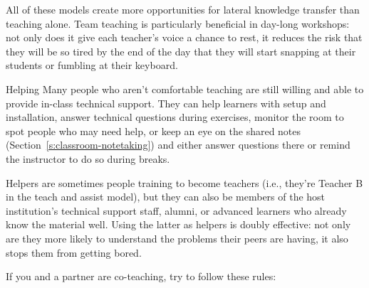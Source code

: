 All of these models create more opportunities for lateral knowledge
transfer than teaching alone. Team teaching is particularly beneficial
in day-long workshops: not only does it give each teacher's voice a
chance to rest, it reduces the risk that they will be so tired by the
end of the day that they will start snapping at their students or
fumbling at their keyboard.

\begin{aside}{Helping}
  Many people who aren't comfortable teaching are still willing and able
  to provide in-class technical support. They can help learners with
  setup and installation, answer technical questions during exercises,
  monitor the room to spot people who may need help, or keep an eye on
  the shared notes (Section~\ref{s:classroom-notetaking}) and either
  answer questions there or remind the instructor to do so during
  breaks.

  Helpers are sometimes people training to become teachers (i.e.,
  they're Teacher B in the teach and assist model), but they can also
  be members of the host institution's technical support staff, alumni,
  or advanced learners who already know the material well. Using the
  latter as helpers is doubly effective: not only are they more likely
  to understand the problems their peers are having, it also stops them
  from getting bored.
\end{aside}

If you and a partner are co-teaching, try to follow these rules:

